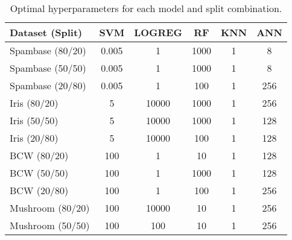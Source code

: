\documentclass{article}
\begin{document}
\begin{table}
	\caption{Optimal hyperparameters for each model and split combination.}
	\label{hyperparameter-table}
	\centering
	\begin{tabular}{l|c|c|c|c|c}
		\toprule
		\textbf{Dataset (Split)}  & \multicolumn{1}{c|}{SVM} & \multicolumn{1}{c|}{LOGREG} & \multicolumn{1}{c|}{RF} & \multicolumn{1}{c|}{KNN} & \multicolumn{1}{c}{ANN} \\ \midrule
		Spambase (80/20)          & 0.005                    & 1                           & 1000                    & 1                        & 8                       \\
		Spambase (50/50)          & 0.005                    & 1                           & 1000                    & 1                        & 8                       \\
		Spambase (20/80)          & 0.005                    & 1                           & 100                     & 1                        & 256                     \\
		\midrule Iris (80/20)     & 5                        & 10000                       & 1000                    & 1                        & 256                     \\
		Iris (50/50)              & 5                        & 10000                       & 1000                    & 1                        & 128                     \\
		Iris (20/80)              & 5                        & 10000                       & 100                     & 1                        & 128                     \\
		\midrule BCW (80/20)      & 100                      & 1                           & 10                      & 1                        & 128                     \\
		BCW (50/50)               & 100                      & 1                           & 1000                    & 1                        & 128                     \\
		BCW (20/80)               & 100                      & 1                           & 100                     & 1                        & 256                     \\
		\midrule Mushroom (80/20) & 100                      & 10000                       & 10                      & 1                        & 256                     \\
		Mushroom (50/50)          & 100                      & 100                         & 10                      & 1                        & 256                     \\

\end{tabular}
\end{table}
\end{document}

